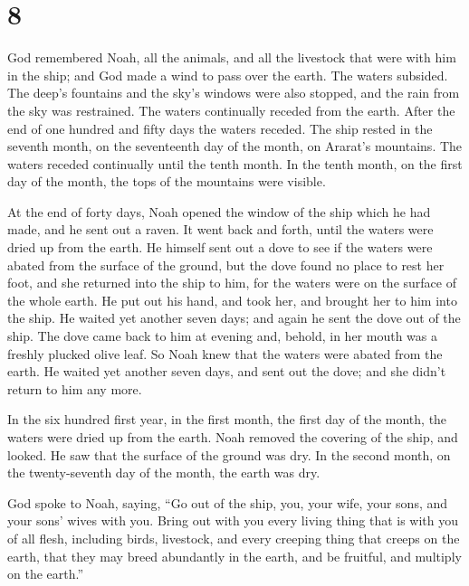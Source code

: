 \hypertarget{section-7}{%
\section{8}\label{section-7}}

 God remembered Noah, all the animals, and all the
livestock that were with him in the ship; and God made a wind to pass
over the earth. The waters subsided.  The deep's fountains
and the sky's windows were also stopped, and the rain from the sky was
restrained.  The waters continually receded from the
earth. After the end of one hundred and fifty days the waters receded.
 The ship rested in the seventh month, on the seventeenth
day of the month, on Ararat's mountains.  The waters
receded continually until the tenth month. In the tenth month, on the
first day of the month, the tops of the mountains were visible.

 At the end of forty days, Noah opened the window of the
ship which he had made,  and he sent out a raven. It went
back and forth, until the waters were dried up from the earth.
 He himself sent out a dove to see if the waters were
abated from the surface of the ground,  but the dove found
no place to rest her foot, and she returned into the ship to him, for
the waters were on the surface of the whole earth. He put out his hand,
and took her, and brought her to him into the ship.  He
waited yet another seven days; and again he sent the dove out of the
ship.  The dove came back to him at evening and, behold,
in her mouth was a freshly plucked olive leaf. So Noah knew that the
waters were abated from the earth.  He waited yet another
seven days, and sent out the dove; and she didn't return to him any
more.

 In the six hundred first year, in the first month, the
first day of the month, the waters were dried up from the earth. Noah
removed the covering of the ship, and looked. He saw that the surface of
the ground was dry.  In the second month, on the
twenty-seventh day of the month, the earth was dry.

 God spoke to Noah, saying,  ``Go out of
the ship, you, your wife, your sons, and your sons' wives with you.
 Bring out with you every living thing that is with you
of all flesh, including birds, livestock, and every creeping thing that
creeps on the earth, that they may breed abundantly in the earth, and be
fruitful, and multiply on the earth.''

